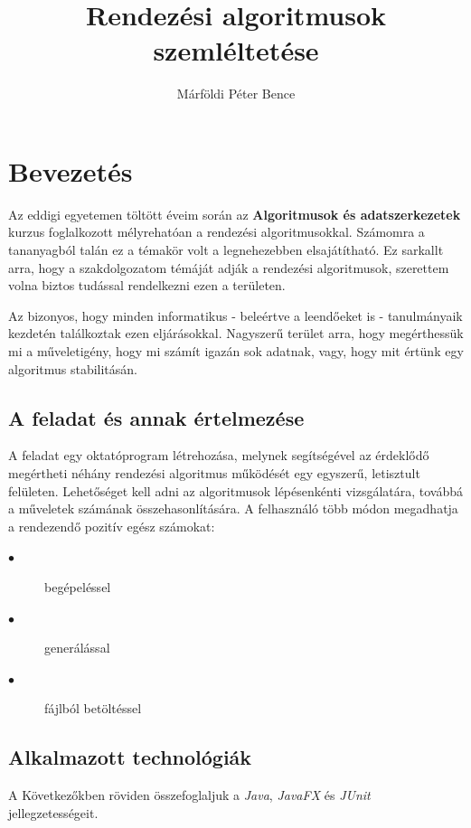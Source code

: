 \documentclass{elteikthesis}
\title{Rendezési algoritmusok szemléltetése}
\author{Márföldi Péter Bence}
\begin{document}
\frontmatter

	\maketitle
	\renewcommand{\thepage}{}
	\tableofcontents
	
\mainmatter
	\pagestyle{fancy}

\chapter{Bevezetés} 
 Az eddigi egyetemen töltött éveim során az \textbf{Algoritmusok és adatszerkezetek} kurzus foglalkozott mélyrehatóan a rendezési algoritmusokkal. Számomra a tananyagból talán ez a témakör volt a legnehezebben elsajátítható. Ez sarkallt arra, hogy a szakdolgozatom témáját adják a rendezési algoritmusok, szerettem volna biztos tudással rendelkezni ezen a területen.\par
 Az bizonyos, hogy minden informatikus - beleértve a leendőeket is - tanulmányaik kezdetén találkoztak ezen eljárásokkal. Nagyszerű terület arra, hogy megérthessük mi a műveletigény, hogy mi számít igazán sok adatnak, vagy, hogy mit értünk egy algoritmus stabilitásán.\par

\section{A feladat és annak értelmezése}
A feladat egy oktatóprogram létrehozása, melynek segítségével az érdeklődő megértheti néhány rendezési algoritmus működését egy egyszerű, letisztult felületen. Lehetőséget kell adni az algoritmusok lépésenkénti vizsgálatára, továbbá a műveletek számának összehasonlítására. A felhasználó több módon megadhatja a rendezendő pozitív egész számokat:
\begin{description}
	\item[$\bullet$] begépeléssel
	\item[$\bullet$] generálással
	\item[$\bullet$] fájlból betöltéssel
\end{description}

\section{Alkalmazott technológiák}
A Következőkben röviden összefoglaljuk a \emph{Java}\cite{Java}, \emph{JavaFX}\cite{JavaFX} és \emph{JUnit}\cite{JUnit} jellegzetességeit.
\end{document}
